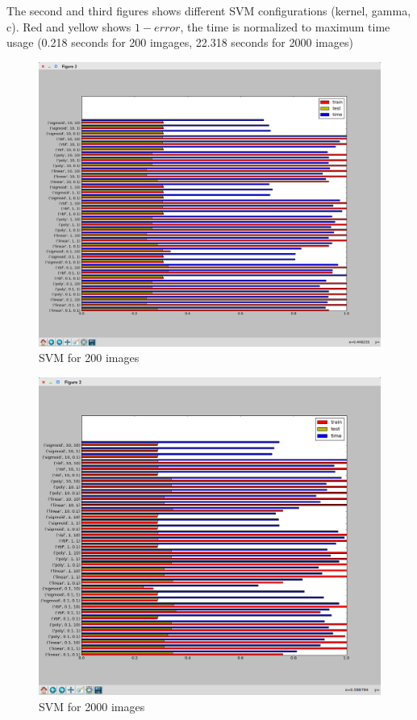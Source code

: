 The second and third figures shows different SVM configurations (kernel, gamma, c). Red and yellow shows $1 - error$, the time is normalized to maximum time usage (0.218 seconds for 200 imgages, 22.318 seconds for 2000 images)
\begin{figure}[!htb]
	\includegraphics[width=\textwidth]{images/svm200}
	\caption{SVM for 200 images}
\end{figure}

\begin{figure}[!htb]
	\includegraphics[width=\textwidth]{images/svm2000}
	\caption{SVM for 2000 images}
\end{figure}

